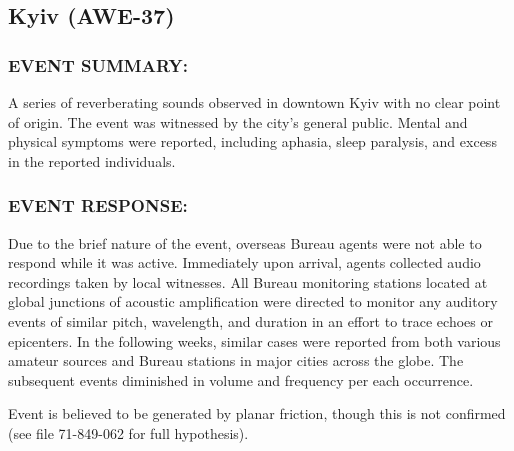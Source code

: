 \subsection*{Kyiv (AWE-37)}
\subsubsection*{EVENT SUMMARY:}
\par A series of reverberating sounds observed in downtown Kyiv with
no clear point of origin. The event was witnessed by the city's
general public. Mental and physical symptoms were reported,
including aphasia, sleep paralysis, and excess  in the
reported individuals.
\subsubsection*{EVENT RESPONSE:}

\par Due to the brief nature of the event, overseas Bureau agents
were not able to respond while it was active. Immediately upon
arrival, agents collected audio recordings taken by local
witnesses. All Bureau monitoring stations located at global
junctions of acoustic amplification were directed to monitor any
auditory events of similar pitch, wavelength, and duration in an
effort to trace echoes or epicenters. In the following weeks,
similar cases were reported from both various amateur sources
and Bureau stations in major cities across the globe. The
subsequent events diminished in volume and frequency per each
occurrence.
\par Event is believed to be generated by planar friction, though this is
not confirmed (see file 71-849-062 for full hypothesis).